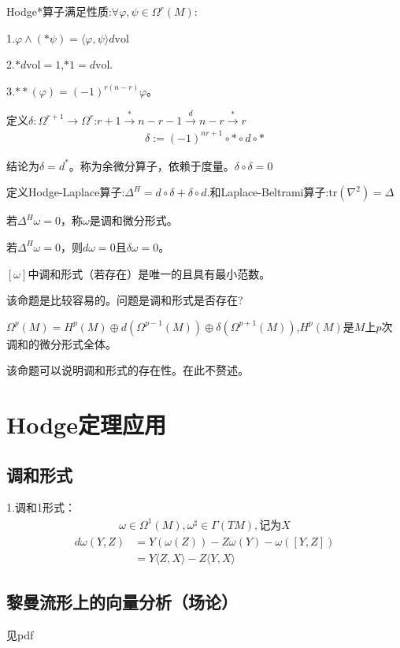 Hodge*算子满足性质:$\forall \varphi,\psi \in \Omega^{r}(M)$:

1.$\varphi \wedge (*\psi)=\langle \varphi,\psi \rangle d\mathrm{vol}$

2.$*d \mathrm{vol}=1$,$*1=d\mathrm{vol}$.

3.$**(\varphi)=(-1)^{r(n-r)}\varphi$。

定义$\delta:\Omega^{r+1}\to \Omega^r$:$r+1 \stackrel{*}{\rightarrow} n-r-1 \stackrel{d}{\rightarrow} n-r \stackrel{*}{\rightarrow} r$
\begin{align*}
    \delta:=(-1)^{nr+1}\circ * \circ d \circ *
\end{align*}

结论为$\delta=d^*$。称为余微分算子，依赖于度量。$\delta \circ \delta=0$

定义Hodge-Laplace算子:$\Delta^H=d \circ \delta+\delta \circ d$.和Laplace-Beltrami算子:$\mathrm{tr}(\nabla^2)=\Delta$

若$\Delta^H \omega=0$，称$\omega$是调和微分形式。

若$\Delta^H \omega=0$，则$d\omega=0$且$\delta \omega=0$。
\begin{proposition}
    $[\omega]$中调和形式（若存在）是唯一的且具有最小范数。
\end{proposition}
该命题是比较容易的。问题是调和形式是否存在?

\begin{theorem}
    $\Omega^p(M)=H^p(M)\oplus d(\Omega^{p-1}(M)) \oplus \delta( \Omega^{p+1}(M))$,$H^p(M)$是$M$上$p$次调和的微分形式全体。
\end{theorem}
该命题可以说明调和形式的存在性。在此不赘述。

\section{Hodge定理应用}
\subsection{调和形式}
1.调和1形式：
\begin{align*}
    \omega \in \Omega^1(M), \omega^{\sharp} \in \Gamma(TM),\text{记为}X
\end{align*}
\begin{align*}
    d\omega(Y,Z)&=Y(\omega(Z))-Z\omega(Y)-\omega([Y,Z])\\
    &=Y\langle Z,X\rangle-Z \langle Y,X \rangle
\end{align*}
\subsection{黎曼流形上的向量分析（场论）}
见pdf

